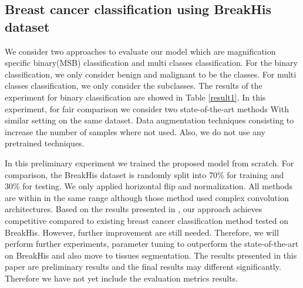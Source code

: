 \documentclass[review]{cvpr}
\begin{document}
\subsection{Breast cancer classification using BreakHis dataset}
We consider two approaches to evaluate our model which are magnification specific binary(MSB) classification  and  multi classes classification. For the binary classification, we only consider benign and malignant to be the classes. For multi classes classification, we only consider the subclasses. The results of the experiment for binary classification are showed in Table \ref{result1}. In this experiment, for fair comparison we consider two state-of-the-art methods\cite{Xie2019,8353225} With similar setting on the same dataset.  Data augmentation techniques  consisting to increase the number of samples where not used. Also, we do not use any pretrained techniques.

\begin{table}[ht]
\centering
{}
\caption{Comparison of MSB classification results. VGG stands for VGG-16 architecture and Ens stands for Ensemble method proposed in \cite{8353225}. Boldface means the maximum within the respective column.}
\label{result1}
\end{table}

In this preliminary experiment we trained the proposed model from scratch. For comparison, the BreakHis dataset is randomly split into 70\% for training and 30\% for testing. We only applied horizontal flip and normalization. All methods are within in the same range although those method used complex convolution architectures. Based on the results presented in \cite{BENHAMMOU20209}, our approach achieves competitive compared to existing breast cancer classification method tested on BreakHis. However, further improvement are still needed. Therefore, we will perform further experiments, parameter tuning to outperform the state-of-the-art on BreakHis and also move to tissues segmentation. The results presented in this paper are preliminary results and the final results may different significantly. Therefore we have not yet include the evaluation metrics results.
\end{document}
